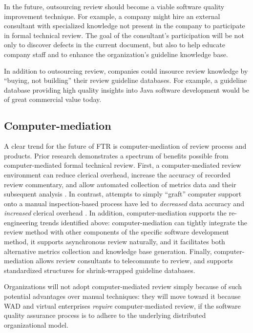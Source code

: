 In the future, outsourcing review should become a viable software quality
improvement technique.  For example, a company might hire an external
consultant with specialized knowledge not present in the company to
participate in formal technical review.  The goal of the consultant's
participation will be not only to discover defects in the current document,
but also to help educate company staff and to enhance the organization's
guideline knowledge base.

In addition to outsourcing review, companies could insource
review knowledge by ``buying, not building'' their review guideline databases.
For example, a guideline database providing high quality insights into Java
software development would be of great commercial value today.

\subsection*{Computer-mediation}

A clear trend for the future of FTR is computer-mediation of review process
and products.  Prior research demonstrates a spectrum of benefits possible
from computer-mediated formal technical review. First, a
computer-mediated review environment can reduce clerical overhead, increase the
accuracy of recorded review commentary, and allow automated collection of
metrics data and their subsequent analysis \cite{Johnson94}.  In contrast,
attempts to simply ``graft'' computer support onto a manual
inspection-based process have led to {\em decreased} data accuracy and {\em
  increased} clerical overhead \cite{Weller93}.  In addition,
computer-mediation supports the re-engineering trends identified above:
computer-mediation can tightly integrate the review method with other
components of the specific software development method, it supports
asynchronous review naturally, and it facilitates both alternative metrics
collection and knowledge base generation. Finally, computer-mediation
allows review consultants to telecommute to review, and supports
standardized structures for shrink-wrapped guideline databases.

Organizations will not adopt computer-mediated review simply because of
such potential advantages over manual techniques: they will move toward it
because WAD and virtual enterprises {\em require \/} computer-mediated
review, if the software quality assurance process is to adhere to the 
underlying distributed organizational model.



